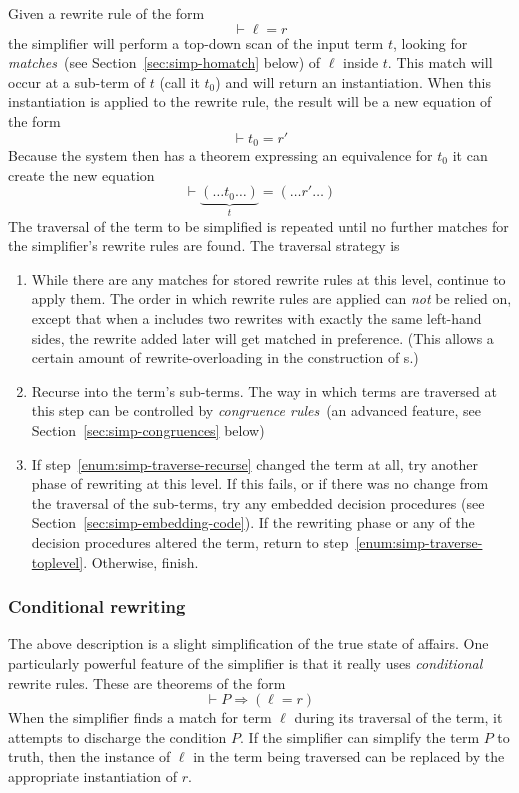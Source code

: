 Given a rewrite rule of the form \[
\vdash \ell = r
\]
the simplifier will perform a top-down scan of the input term $t$,
looking for \emph{matches}~(see Section~\ref{sec:simp-homatch} below)
of $\ell$ inside $t$.  This match will occur at a sub-term of $t$
(call it $t_0$) and will return an instantiation.  When this
instantiation is applied to the rewrite rule, the result will be a new
equation of the form \[
\vdash t_0 = r'
\]
Because the system then has a theorem expressing an equivalence for
$t_0$ it can create the new equation \[
  \vdash \underbrace{(\dots t_0\dots)}_t = (\dots r' \dots)
\]
The traversal of the term to be simplified is repeated until no
further matches for the simplifier's rewrite rules are found.  The
traversal strategy is
\begin{enumerate}
\item \label{enum:simp-traverse-toplevel}%
  While there are any matches for stored rewrite rules at this level,
  continue to apply them.  The order in which rewrite rules are
  applied can \emph{not} be relied on, except that when a \simpset{}
  includes two rewrites with exactly the same left-hand sides, the
  rewrite added later will get matched in preference.  (This allows a
  certain amount of rewrite-overloading in the construction of
  \simpset{}s.)
\item \label{enum:simp-traverse-recurse}%
  Recurse into the term's sub-terms.  The way in which terms are
  traversed at this step can be controlled by \emph{congruence
    rules}~(an advanced feature, see Section~\ref{sec:simp-congruences}
  below)
\item If step~\ref{enum:simp-traverse-recurse} changed the term at
  all, try another phase of rewriting at this level.  If this fails,
  or if there was no change from the traversal of the sub-terms, try
  any embedded decision procedures (see
  Section~\ref{sec:simp-embedding-code}).  If the rewriting phase or
  any of the decision procedures altered the term, return to
  step~\ref{enum:simp-traverse-toplevel}.  Otherwise, finish.
\end{enumerate}

\subsubsection{Conditional rewriting}

The above description is a slight simplification of the true state of
affairs.  One particularly powerful feature of the simplifier is that
it really uses \emph{conditional} rewrite rules.  These are theorems
of the form
\[
\vdash P \Rightarrow (\ell = r)
\]
When the simplifier finds a match for term $\ell$ during its traversal
of the term, it attempts to discharge the condition $P$.  If the
simplifier can simplify the term $P$ to truth, then the instance of
$\ell$ in the term being traversed can be replaced by the appropriate
instantiation of $r$.

